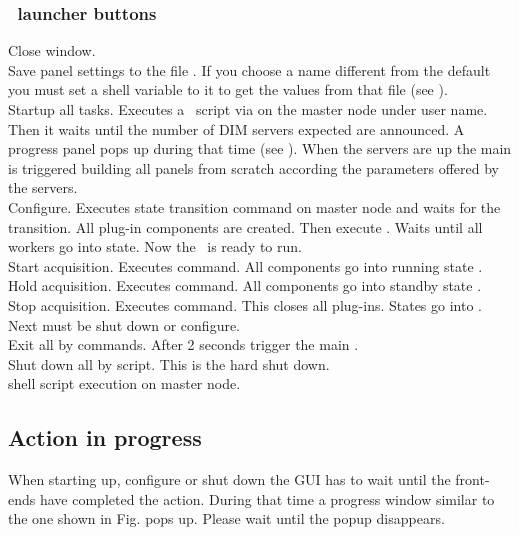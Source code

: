 {\subsubsection{\dabc\ launcher buttons}
 Close window.\\
 Save panel settings to the file .
If you choose a name different from the default you must
set a shell variable to it to get the values from that file
(see ).\\
 Startup all tasks. Executes a \dabc\ script  via  
on the master node under user name. Then it waits until the number of DIM servers
expected are announced. A progress panel pops up during that time
(see ).
When the servers are up the main  is triggered building
all panels from scratch according the parameters offered by the servers.\\
 Configure. Executes state transition command 
on master node and waits for the transition.
All plug-in components are created. Then execute .
Waits until all workers go into  state. Now the \dabc\ is ready to run.\\
 Start acquisition. Executes  command.
All components go into running state .\\
 Hold acquisition. Executes  command.
All components go into standby state .\\
 Stop acquisition. Executes  command.
This closes all plug-ins. States go into . Next must be
shut down or configure.\\
 Exit all by  commands. After 2 seconds 
trigger the main .\\
 Shut down all by script. This is the hard shut down.\\
  shell script execution on master node.\\
\subsection{Action in progress}
\label{user:guiProgress}
When starting up, configure or shut down the GUI has to wait
until the front-ends have completed the action.
During that time a progress window similar to the one shown
in Fig.  pops up.
Please wait until the popup disappears.
}
